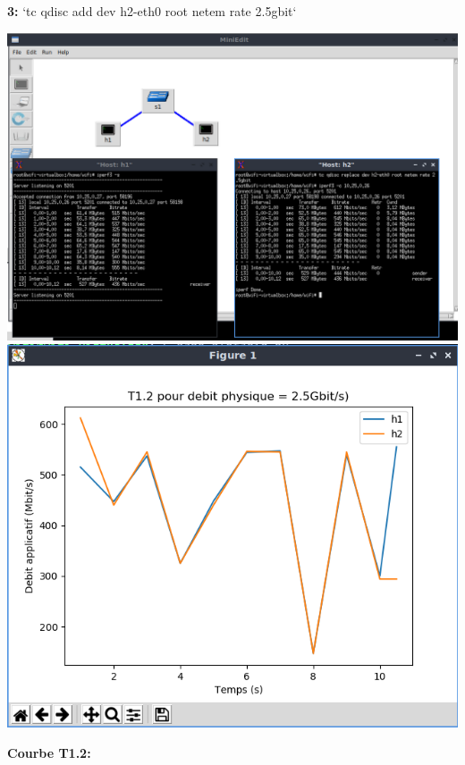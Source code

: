 \vspace{1cm}
\\
\textbf{3:} `tc qdisc add dev h2-eth0 root netem rate 2.5gbit`
\begin{center}
    \includegraphics[width=1\textwidth]{./images/T1.2/2500test2.png}
    \includegraphics[width=1\textwidth]{./images/T1.2/courbe2500test2.png}
\end{center}

\newpage
\textbf{Courbe T1.2:} 




